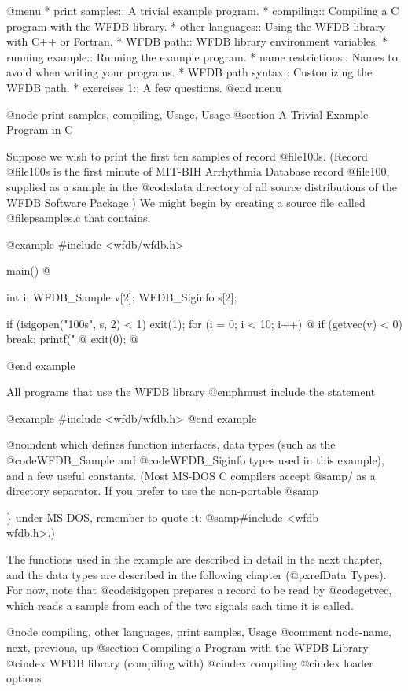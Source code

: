 {@menu
* print samples::		A trivial example program.
* compiling::			Compiling a C program with the WFDB library.
* other languages::             Using the WFDB library with C++ or Fortran.
* WFDB path::			WFDB library environment variables.
* running example::		Running the example program.
* name restrictions::		Names to avoid when writing your programs.
* WFDB path syntax::		Customizing the WFDB path.
* exercises 1::			A few questions.
@end menu

@node     print samples, compiling, Usage, Usage
@section A Trivial Example Program in C

Suppose we wish to print the first ten samples of record @file{100s}.
(Record @file{100s} is the first minute of MIT-BIH Arrhythmia Database
record @file{100}, supplied as a sample in the @code{data} directory of all
source distributions of the WFDB Software Package.)  We might begin by
creating a source file called @file{psamples.c} that contains:

@example
#include <wfdb/wfdb.h>

main()
@{
    int i;
    WFDB_Sample v[2];
    WFDB_Siginfo s[2];

    if (isigopen("100s", s, 2) < 1)
        exit(1);
    for (i = 0; i < 10; i++) @{
        if (getvec(v) < 0)
            break;
        printf("%
    @}
    exit(0);
@}
@end example

All programs that use the WFDB library @emph{must} include the
statement

@example
#include <wfdb/wfdb.h>
@end example

@noindent
which defines function interfaces, data types (such as the
@code{WFDB_Sample} and @code{WFDB_Siginfo} types used in this example), and
a few useful constants.  (Most MS-DOS C compilers accept @samp{/} as a
directory separator.  If you prefer to use the non-portable @samp{\}
under MS-DOS, remember to quote it: @samp{#include <wfdb\\wfdb.h>}.)

The functions used in the example are described in detail in the next
chapter, and the data types are described in the following chapter
(@pxref{Data Types}).  For now, note that @code{isigopen} prepares a
record to be read by @code{getvec}, which reads a sample from each of
the two signals each time it is called.

@node     compiling, other languages, print samples, Usage
@comment  node-name,  next,  previous,  up
@section Compiling a Program with the WFDB Library
@cindex WFDB library (compiling with)
@cindex compiling
@cindex loader options

}}
